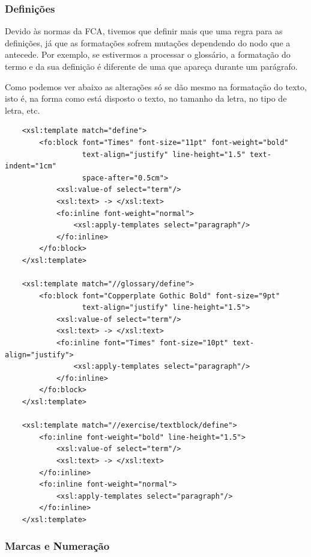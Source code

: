 \documentclass[a4paper]{article}
\begin{document}
\subsubsection{Definições}

\hspace{1cm}Devido às normas da FCA, tivemos que definir mais que uma regra para as definições, já que as formatações sofrem mutações dependendo do nodo que a antecede. Por exemplo, se estivermos a processar o glossário, a formatação do termo e da sua definição é diferente de uma que apareça durante um parágrafo.

\hspace{1cm}Como podemos ver abaixo as alterações só se dão mesmo na formatação do texto, isto é, na forma como está disposto o texto, no tamanho da letra, no tipo de letra, etc.\\

\begin{small}
\begin{lstlisting}
    <xsl:template match="define">
        <fo:block font="Times" font-size="11pt" font-weight="bold" 
                  text-align="justify" line-height="1.5" text-indent="1cm" 
                  space-after="0.5cm">
            <xsl:value-of select="term"/>
            <xsl:text> -> </xsl:text>
            <fo:inline font-weight="normal">
                <xsl:apply-templates select="paragraph"/>
            </fo:inline>
        </fo:block>
    </xsl:template>

    <xsl:template match="//glossary/define">
        <fo:block font="Copperplate Gothic Bold" font-size="9pt"
                  text-align="justify" line-height="1.5">
            <xsl:value-of select="term"/>
            <xsl:text> -> </xsl:text>
            <fo:inline font="Times" font-size="10pt" text-align="justify">
                <xsl:apply-templates select="paragraph"/>
            </fo:inline>
        </fo:block>
    </xsl:template>

    <xsl:template match="//exercise/textblock/define">
        <fo:inline font-weight="bold" line-height="1.5">
            <xsl:value-of select="term"/>
            <xsl:text> -> </xsl:text>
        </fo:inline>
        <fo:inline font-weight="normal">
            <xsl:apply-templates select="paragraph"/>
        </fo:inline>
    </xsl:template>
\end{lstlisting}
\end{small}

\subsubsection{Marcas e Numeração}
\end{document}
